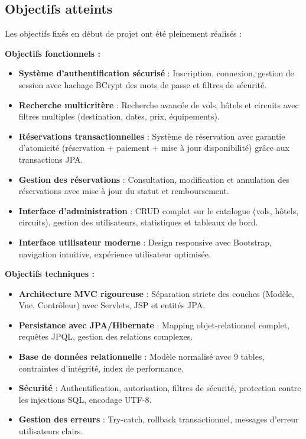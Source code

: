 \documentclass[12pt,a4paper]{report}
\begin{document}
\subsection*{Objectifs atteints}

Les objectifs fixés en début de projet ont été pleinement réalisés :

\textbf{Objectifs fonctionnels :}
\begin{itemize}
    \item [OK] \textbf{Système d'authentification sécurisé} : Inscription, connexion, gestion de session avec hachage BCrypt des mots de passe et filtres de sécurité.
    
    \item [OK] \textbf{Recherche multicritère} : Recherche avancée de vols, hôtels et circuits avec filtres multiples (destination, dates, prix, équipements).
    
    \item [OK] \textbf{Réservations transactionnelles} : Système de réservation avec garantie d'atomicité (réservation + paiement + mise à jour disponibilité) grâce aux transactions JPA.
    
    \item [OK] \textbf{Gestion des réservations} : Consultation, modification et annulation des réservations avec mise à jour du statut et remboursement.
    
    \item [OK] \textbf{Interface d'administration} : CRUD complet sur le catalogue (vols, hôtels, circuits), gestion des utilisateurs, statistiques et tableaux de bord.
    
    \item [OK] \textbf{Interface utilisateur moderne} : Design responsive avec Bootstrap, navigation intuitive, expérience utilisateur optimisée.
\end{itemize}

\textbf{Objectifs techniques :}
\begin{itemize}
    \item [OK] \textbf{Architecture MVC rigoureuse} : Séparation stricte des couches (Modèle, Vue, Contrôleur) avec Servlets, JSP et entités JPA.
    
    \item [OK] \textbf{Persistance avec JPA/Hibernate} : Mapping objet-relationnel complet, requêtes JPQL, gestion des relations complexes.
    
    \item [OK] \textbf{Base de données relationnelle} : Modèle normalisé avec 9 tables, contraintes d'intégrité, index de performance.
    
    \item [OK] \textbf{Sécurité} : Authentification, autorisation, filtres de sécurité, protection contre les injections SQL, encodage UTF-8.
    
    \item [OK] \textbf{Gestion des erreurs} : Try-catch, rollback transactionnel, messages d'erreur utilisateurs clairs.
\end{itemize}
\end{document}
